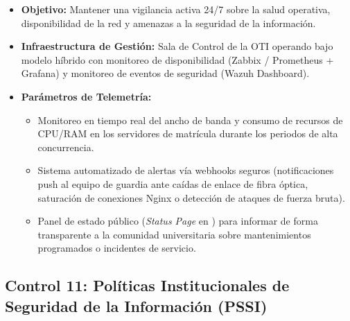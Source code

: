 \begin{itemize}
    \item \textbf{Objetivo:} Mantener una vigilancia activa 24/7 sobre la salud operativa, disponibilidad de la red y amenazas a la seguridad de la información.
    \item \textbf{Infraestructura de Gestión:} Sala de Control de la OTI operando bajo modelo híbrido con monitoreo de disponibilidad (Zabbix / Prometheus + Grafana) y monitoreo de eventos de seguridad (Wazuh Dashboard).
    \item \textbf{Parámetros de Telemetría:}
    \begin{itemize}
        \item Monitoreo en tiempo real del ancho de banda y consumo de recursos de CPU/RAM en los servidores de matrícula durante los periodos de alta concurrencia.
        \item Sistema automatizado de alertas vía webhooks seguros (notificaciones push al equipo de guardia ante caídas de enlace de fibra óptica, saturación de conexiones Nginx o detección de ataques de fuerza bruta).
        \item Panel de estado público (\textit{Status Page} en ) para informar de forma transparente a la comunidad universitaria sobre mantenimientos programados o incidentes de servicio.
    \end{itemize}
\end{itemize}

\newpage
\subsection{Control 11: Políticas Institucionales de Seguridad de la Información (PSSI)}

